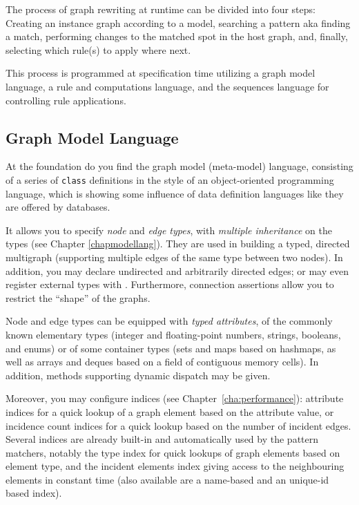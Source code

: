 The process of graph rewriting at runtime can be divided into four steps:
Creating an instance graph according to a model,
searching a pattern aka finding a match,
performing changes to the matched spot in the host graph,
and, finally, selecting which rule(s) to apply where next.

This process is programmed at specification time utilizing a graph model language, a rule and computations language, and the sequences language for controlling rule applications.

\subsection{Graph Model Language}
At the foundation do you find the graph model (meta-model) language, consisting of a series of \texttt{class} definitions in the style of an object-oriented programming language, which is showing some influence of data definition languages like they are offered by databases. 

It allows you to specify \emph{node} and \emph{edge types}, with \emph{multiple inheritance} on the types (see Chapter \ref{chapmodellang}).
They are used in building a typed, directed multigraph (supporting multiple edges of the same type between two nodes).
In addition, you may declare undirected and arbitrarily directed edges; or may even register external types with \GrG.
Furthermore, connection assertions allow you to restrict the ``shape'' of the graphs.

Node and edge types can be equipped with \emph{typed attributes}, of the commonly known elementary types (integer and floating-point numbers, strings, booleans, and enums) or of some container types (sets and maps based on hashmaps, as well as arrays and deques based on a field of contiguous memory cells).
In addition, methods supporting dynamic dispatch may be given.%

Moreover, you may configure indices (see Chapter~\ref{cha:performance}): attribute indices for a quick lookup of a graph element based on the attribute value, or incidence count indices for a quick lookup based on the number of incident edges.
Several indices are already built-in and automatically used by the pattern matchers, notably the type index for quick lookups of graph elements based on element type, and the incident elements index giving access to the neighbouring elements in constant time (also available are a name-based and an unique-id based index).

